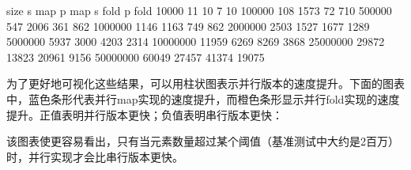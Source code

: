 \begin{shell}
    size   s map   p map  s fold  p fold
   10000      11      10       7      10
  100000     108    1573      72     710
  500000     547    2006     361     862
 1000000    1146    1163     749     862
 2000000    2503    1527    1677    1289
 5000000    5937    3000    4203    2314
10000000   11959    6269    8269    3868
25000000   29872   13823   20961    9156
50000000   60049   27457   41374   19075
\end{shell}

为了更好地可视化这些结果，可以用柱状图表示并行版本的速度提升。下面的图表中，蓝色条形代表并行map实现的速度提升，而橙色条形显示并行fold实现的速度提升。正值表明并行版本更快；负值表明串行版本更快：


该图表使更容易看出，只有当元素数量超过某个阈值（基准测试中大约是2百万）时，并行实现才会比串行版本更快。







